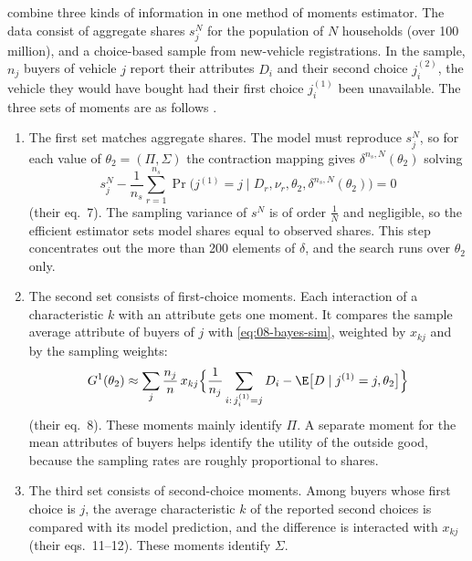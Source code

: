 \citet{BerryLevinsohnPakes2004} combine three kinds of information in one method of moments estimator. The data
consist of aggregate shares $s^N_j$ for the population of $N$ households (over 100 million), and a choice-based sample
from new-vehicle registrations. In the sample, $n_j$ buyers of vehicle $j$ report their attributes $D_i$ and their
second choice $j^{(2)}_i$, the vehicle they would have bought had their first choice $j^{(1)}_i$ been unavailable.
The three sets of moments are as follows \citep[pp.~74--79]{BerryLevinsohnPakes2004}.
\begin{enumerate}
  \item The first set matches aggregate shares. The model must reproduce $s^N_j$, so for each value of $\theta_2 = (\Pi, \Sigma)$ the
  contraction mapping gives $\delta^{n_s,N}(\theta_2)$ solving
  \begin{equation}\label{eq:08-blp04-shares}
    s^N_j - \frac{1}{n_s}\sum_{r=1}^{n_s}\Pr\big(j^{(1)} = j \mid D_r, \nu_r, \theta_2, \delta^{n_s,N}(\theta_2)\big) = 0
  \end{equation}
  (their eq.~7). The sampling variance of $s^N$ is of order $\frac{1}{N}$ and negligible, so the efficient estimator
  sets model shares equal to observed shares. This step concentrates out the more than 200 elements of $\delta$, and
  the search runs over $\theta_2$ only.
  \item The second set consists of first-choice moments. Each interaction of a characteristic $k$ with an attribute gets one moment. It compares
  the sample average attribute of buyers of $j$ with \eqref{eq:08-bayes-sim}, weighted by $x_{kj}$ and by the sampling
  weights:
  \begin{equation}\label{eq:08-blp04-g1}
    G^1(\theta_2) \approx \sum_j \frac{n_j}{n}\,x_{kj}\Big\{\frac{1}{n_j}\sum_{i:\,j^{(1)}_i = j}D_i -
    \E\big[D \mid j^{(1)} = j, \theta_2\big]\Big\}
  \end{equation}
  (their eq.~8). These moments mainly identify $\Pi$. A separate moment for the mean attributes of buyers helps
  identify the utility of the outside good, because the sampling rates are roughly proportional to shares.
  \item The third set consists of second-choice moments. Among buyers whose first choice is $j$, the average characteristic $k$ of the reported
  second choices is compared with its model prediction, and the difference is interacted with $x_{kj}$ (their
  eqs.~11--12). These moments identify $\Sigma$.
\end{enumerate}


